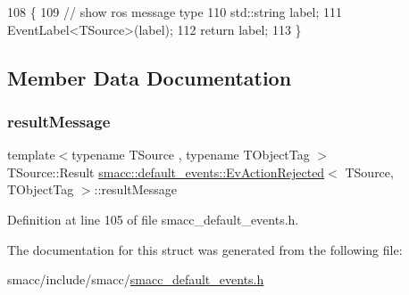\begin{DoxyCode}
108   \{
109     \textcolor{comment}{// show ros message type}
110     std::string label;
111     EventLabel<TSource>(label);
112     \textcolor{keywordflow}{return} label;
113   \}
\end{DoxyCode}


\subsection{Member Data Documentation}
\mbox{\label{structsmacc_1_1default__events_1_1EvActionRejected_a40b6bcf337a76104499c82d0c4d5a49f}} 
\subsubsection{\texorpdfstring{result\+Message}{resultMessage}}
{\footnotesize\ttfamily template$<$typename T\+Source , typename T\+Object\+Tag $>$ \\
T\+Source\+::\+Result \hyperlink{structsmacc_1_1default__events_1_1EvActionRejected}{smacc\+::default\+\_\+events\+::\+Ev\+Action\+Rejected}$<$ T\+Source, T\+Object\+Tag $>$\+::result\+Message}



Definition at line 105 of file smacc\+\_\+default\+\_\+events.\+h.



The documentation for this struct was generated from the following file\+:\begin{DoxyCompactItemize}
\item 
smacc/include/smacc/\hyperlink{smacc__default__events_8h}{smacc\+\_\+default\+\_\+events.\+h}\end{DoxyCompactItemize}
